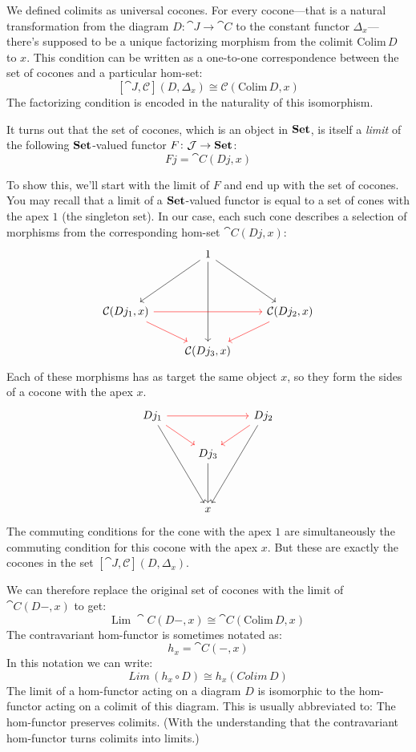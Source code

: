 \documentclass[DaoFP]{subfiles}
\begin{document}
We defined colimits as universal cocones. For every cocone---that is a natural transformation from the diagram $D \colon \cat J \to \cat C$ to the constant functor $\Delta_x$---there's supposed to be a unique factorizing morphism from the colimit $\text{Colim}\, D$ to $x$. This condition can be written as a one-to-one correspondence between the set of cocones and a particular hom-set:
\[ [\cat J, \mathcal{C}](D, \Delta_x)  \cong \mathcal{C}( \text{Colim} \, D, x) \]
The factorizing condition is encoded in the naturality of this isomorphism.

It turns out that the set of cocones, which is an object in $\mathbf{Set}$, is itself a \emph{limit} of the following $\mathbf{Set}$-valued functor $F \colon \mathcal{J} \to \mathbf{Set}$:
\[ F j = \cat C(D j, x) \]

To show this, we'll start with the limit of $F$ and end up with the set of cocones. You may recall that a limit of a $\mathbf{Set}$-valued functor is equal to a set of cones with the apex $1$ (the singleton set). In our case, each such cone describes a selection of morphisms from the corresponding hom-set $\cat C(D j, x)$:
\[
 \begin{tikzcd}
  & 1
\arrow[ddr, ""]
 \arrow[ddl, ""']
 \arrow[ddd, ""]
 \\
\\
\cat C( D j_1, x)
\arrow[rr, red]
\arrow[rd, red]
&& \cat C( D j_2, x)
\arrow[dl, red]
\\
& \cat C( D j_3, x)
 \end{tikzcd}
\]
Each of these morphisms has as target the same object $x$, so they form the sides of a cocone with the apex $x$. 
\[
\begin{tikzcd}
 D j_1
 \arrow[rr, red]
 \arrow[dr, red]
 \arrow[dddr, ""']
 && D j_2
\arrow[dl, red]
 \arrow[dddl, ""]
 \\
 & D j_3
 \arrow[dd, ""]
 \\
 \\
 & x
 \end{tikzcd}
 \]
The commuting conditions for the cone with the apex $1$ are simultaneously the commuting condition for this cocone with the apex $x$. But these are exactly the cocones in the set $ [\cat J, \mathcal{C}](D, \Delta_x)$.

We can therefore replace the original set of cocones with the limit of $\cat C (D-, x)$ to get:
\[ \text{Lim}\; \cat C (D-, x) \cong \cat C( \text{Colim}\,  D, x) \]
The contravariant hom-functor is sometimes notated as:
\[ h_x = \cat C(-, x) \]
In this notation we can write:
\[ Lim \, (h_x \circ D) \cong h_x (Colim \, D) \]
The limit of a hom-functor acting on a diagram $D$ is isomorphic to the hom-functor acting on a colimit of this diagram. This is usually abbreviated to: The hom-functor preserves colimits. (With the understanding that the contravariant hom-functor turns colimits into limits.)
\end{document}
